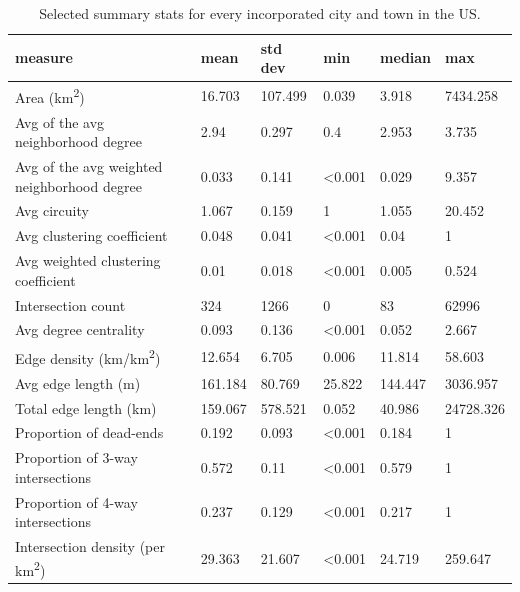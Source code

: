 \documentclass[Afour,sageh,times]{sagej}
\begin{document}
\begin{table}
\centering
\caption{Selected summary stats for every incorporated city and town in the US.}
\label{table03}
\begin{tabular}{llllll}
	\toprule
	measure                                     & mean    & std dev & min            & median         & max       \\
	\midrule
	Area (km\textsuperscript{2})                                  & 16.703  & 107.499 & 0.039          & 3.918          & 7434.258  \\
	Avg of the avg neighborhood degree          & 2.94    & 0.297   & 0.4            & 2.953          & 3.735     \\
	Avg of the avg weighted neighborhood degree & 0.033   & 0.141   & \textless0.001 & 0.029          & 9.357     \\
	Avg circuity                                & 1.067   & 0.159   & 1              & 1.055          & 20.452    \\
	Avg clustering coefficient                  & 0.048   & 0.041   & \textless0.001 & 0.04           & 1         \\
	Avg weighted clustering coefficient         & 0.01    & 0.018   & \textless0.001 & 0.005          & 0.524     \\
	Intersection count                          & 324     & 1266    & 0              & 83             & 62996     \\
	Avg degree centrality                       & 0.093   & 0.136   & \textless0.001 & 0.052          & 2.667     \\
	Edge density (km/km\textsuperscript{2})                       & 12.654  & 6.705   & 0.006          & 11.814         & 58.603    \\
	Avg edge length (m)                         & 161.184 & 80.769  & 25.822         & 144.447        & 3036.957  \\
	Total edge length (km)                      & 159.067 & 578.521 & 0.052          & 40.986         & 24728.326 \\
	Proportion of dead-ends                     & 0.192   & 0.093   & \textless0.001 & 0.184          & 1         \\
	Proportion of 3-way intersections           & 0.572   & 0.11    & \textless0.001 & 0.579          & 1         \\
	Proportion of 4-way intersections           & 0.237   & 0.129   & \textless0.001 & 0.217          & 1         \\
	Intersection density (per km\textsuperscript{2})              & 29.363  & 21.607  & \textless0.001 & 24.719         & 259.647   \\

\end{tabular}
\end{table}
\end{document}
